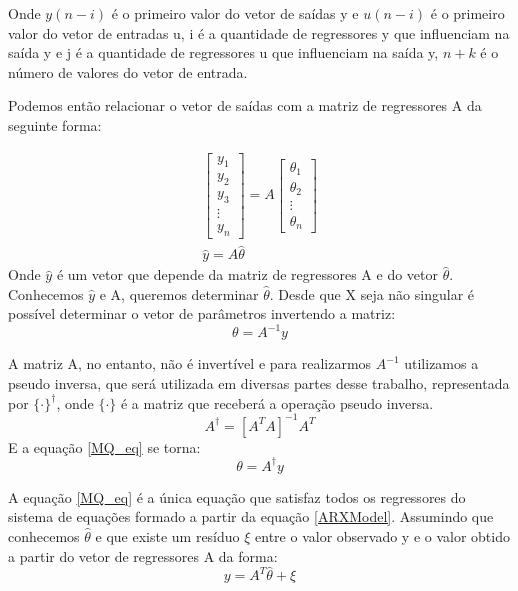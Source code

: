 Onde $y(n-i)$ é o primeiro valor do vetor de saídas y e $u(n-i)$ é o primeiro valor do vetor de entradas u, i é a quantidade de regressores y que influenciam na saída y e j é a quantidade de regressores u que influenciam na saída y, $n+k$ é o número de valores do vetor de entrada.



Podemos então relacionar o vetor de saídas com a matriz de regressores A da seguinte forma:

\begin{equation}
\begin{array}{c}
\begin{bmatrix}
y_1 \\ y_2 \\ y_3\\ \vdots \\ y_n
\end{bmatrix}
=
A
\begin{bmatrix}
\theta_1 \\ \theta_2 \\ \vdots \\ \theta_n
\end{bmatrix}
\\
\hat{y}=A \hat{\theta}
\end{array}
\end{equation}
Onde $\hat{y}$ é um vetor que depende da matriz de regressores A e do vetor $\hat{\theta}$. Conhecemos $\hat{y}$ e A, queremos determinar $\hat{\theta}$. Desde que X seja não singular é possível determinar o vetor de parâmetros invertendo a matriz:
\begin{equation}\label{MQ_eq}
\theta=A^{-1}y
\end{equation}

A matriz A, no entanto, não é invertível e para realizarmos $A^{-1}$ utilizamos a pseudo inversa, que será utilizada em diversas partes desse trabalho, representada por $\{ \cdot\}^\dagger$, onde $\{\cdot\}$ é a matriz que receberá a operação pseudo inversa.
\begin{equation}
A^\dagger=[A^TA]^{-1}A^T
\end{equation}
E a equação \ref{MQ_eq} se torna:
\begin{equation}\label{MQ_eq2}
\theta=A^\dagger y
\end{equation}


A equação \ref{MQ_eq} é a única equação que satisfaz todos os regressores do sistema de equações formado a partir da equação \ref{ARXModel}. Assumindo que conhecemos $\hat{\theta}$ e que existe um resíduo $\xi$ entre o valor observado y e o valor obtido a partir do vetor de regressores A da forma:
\begin{equation}\label{MQxi}
y=A^T\hat{\theta}+\xi
\end{equation} 

